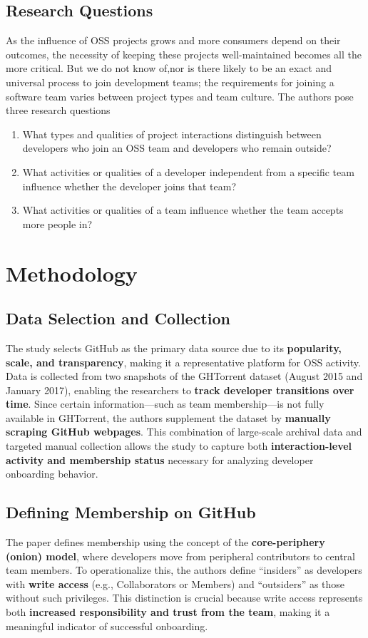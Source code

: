 \subsection{Research Questions}
As the influence of OSS projects grows and more consumers depend on their outcomes, the necessity of keeping these projects well-maintained becomes all the more critical. But we do not know of,nor is there likely to be an exact and universal process to join development teams; the requirements for joining a software team varies between project types and team culture. The authors pose three research questions
\begin{enumerate}[label=\textbf{RQ\arabic*:}, leftmargin=*]
    \item What types and qualities of project interactions distinguish between developers who join an OSS team and developers who remain outside?
    \item What activities or qualities of a developer independent from a specific team influence whether the developer joins that team?
    \item What activities or qualities of a team influence whether the team accepts more people in?
\end{enumerate}

\section{Methodology}
\subsection{Data Selection and Collection}
The study selects GitHub as the primary data source due to its \textbf{popularity, scale, and transparency}, making it a representative platform for OSS activity. Data is collected from two snapshots of the GHTorrent dataset (August 2015 and January 2017), enabling the researchers to \textbf{track developer transitions over time}. Since certain information—such as team membership—is not fully available in GHTorrent, the authors supplement the dataset by \textbf{manually scraping GitHub webpages}. This combination of large-scale archival data and targeted manual collection allows the study to capture both \textbf{interaction-level activity and membership status} necessary for analyzing developer onboarding behavior.

\subsection{Defining Membership on GitHub}
The paper defines membership using the concept of the \textbf{core-periphery (onion) model}, where developers move from peripheral contributors to central team members. To operationalize this, the authors define “insiders” as developers with \textbf{write access} (e.g., Collaborators or Members) and “outsiders” as those without such privileges. This distinction is crucial because write access represents both \textbf{increased responsibility and trust from the team}, making it a meaningful indicator of successful onboarding.

